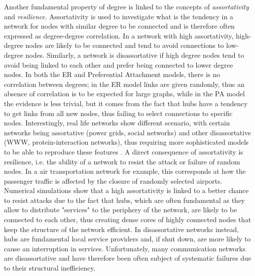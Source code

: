 Another fundamental property of degree  is linked to the concepts of \textit{assortativity} and \textit{resilience}. Assortativity is used to investigate what is the tendency in a network for nodes with similar 
degree to be connected \cite{PhysRevLett.89.208701,Newman2003} and is therefore often expressed as degree-degree correlation. In a network with high assortativity, high-degree nodes are likely to be connected
and tend to avoid connections to low-degree nodes. Similarly, a network is disassortative if high degree nodes tend to avoid being linked to each other and prefer being connected to lower
degree nodes. In both the ER and Preferential Attachment models, there is no correlation between degrees; in the ER model
links are given randomly, thus an absence of correlation is to be expected for large graphs, while in the PA model the evidence is less trivial, but it comes from the fact that hubs have a tendency to get links
from all new nodes, thus failing to select connections to specific nodes. Interestingly, real life networks show different scenario, with certain networks being assortative (power grids, social networks) and other disassortative (WWW, protein-interaction
networks), thus requiring more sophisticated models to be able to reproduce these features \cite{Callaway2001}. A direct consequence of assortativity is resilience, i.e. the ability of a network to resist
the attack or failure of random nodes. In a air transportation network for example, this corresponds at how the passenger traffic is affected by the closure of randomly selected airports. Numerical simulations \cite{PhysRevLett.89.208701}
show that a high assortativity is linked to a better chance to resist attacks due to the fact that hubs, which are often fundamental as they allow to distribute "services" to the periphery of the network, are likely to be connected
to each other, thus creating dense cores of highly connected nodes that keep the structure of the network efficient. In disassortative networks instead, hubs are fundamental local service providers and, if shut down,
are more likely to cause an interruption in services. Unfortunately, many communication networks are disassortative \cite{doi:10.1093/comnet/cnv005} and have therefore been often
subject of systematic failures \cite{Sterbenz20101245} due to their structural inefficiency.


